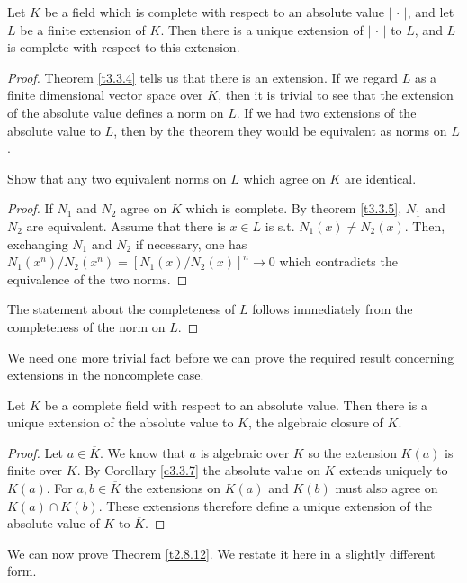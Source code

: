 \begin{coro}
\label{c3.3.7}
Let $K$ be a field which is complete with respect to an absolute value $|\, \cdot\, |$, and let $L$ be a finite extension of $K$. Then there is a unique extension of $|\, \cdot\, |$ to $L$, and $L$ is complete with respect to this extension.
\end{coro}

\begin{proof}
Theorem \ref{t3.3.4} tells us that there is an extension. If we regard $L$ as a finite dimensional vector space over $K$, then it is trivial to see that the extension of the absolute value defines a norm on $L$. If we had two extensions of the absolute value to $L$, then by the theorem they would be equivalent as norms on $L$.
\begin{exo}
\label{e3.3.4}
Show that any two equivalent norms on $L$ which agree on $K$ are identical.
\end{exo}

\begin{proof}
If $N_1$ and $N_2$ agree on $K$ which is complete. By theorem \ref{t3.3.5}, $N_1$ and $N_2$ are equivalent. Assume that there is $x\in L$ is s.t. $N_1(x)\neq N_2(x)$. Then, exchanging $N_1$ and $N_2$ if necessary, one has $N_1(x^n)/N_2(x^n)=\left[N_1(x)/N_2(x)\right]^n \to 0$ which contradicts the equivalence of the two norms. 

\end{proof}

The statement about the completeness of $L$ follows immediately from the completeness of the norm on $L$.
\end{proof}
We need one more trivial fact before we can prove the required result concerning extensions in the noncomplete case.
\begin{prop}
\label{p3.3.3}
Let $K$ be a complete field with respect to an absolute value. Then there is a unique extension of the absolute value to $\overline{K}$, the algebraic closure of $K$.
\end{prop}

\begin{proof}
Let $a\in\overline{K}$. We know that $a$ is algebraic over $K$ so the extension $K(a)$ is finite over $K$. By Corollary \ref{c3.3.7} the absolute value on $K$ extends uniquely to $K(a)$. For $a,b \in\overline{K}$ the extensions on $K(a)$ and $K(b)$ must also agree on $K(a)\cap K(b)$. These extensions therefore define a unique extension of the absolute value of $K$ to $\overline{K}$.
\end{proof}
We can now prove Theorem \ref{t2.8.12}. We restate it here in a slightly different form.

